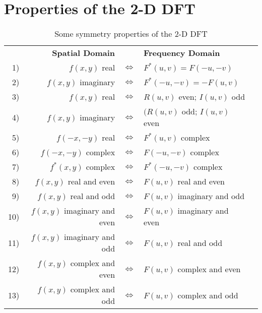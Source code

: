 \appendix
\section{Properties of the 2-D DFT}

\begin{table}[htbp]
	\centering
	\begin{tabular}{|rrllp{0.1cm}|}
	\hline
	& \textbf{Spatial Domain} & & \textbf{Frequency Domain} & \\
	1) & $f(x,y)$ real & $\Leftrightarrow$ & $F^*(u,v) = F(-u,-v)$ & \\
	2) & $f(x,y)$ imaginary & $\Leftrightarrow$ & $F^*(-u,-v) = -F(u,v)$ & \\
	3) & $f(x,y)$ real & $\Leftrightarrow$ & $R(u,v)$ even; $I(u,v)$ odd & \\
	4) & $f(x,y)$ imaginary & $\Leftrightarrow$ & $(R(u,v)$ odd; $I(u,v)$ even & \\
	5) & $f(-x,-y)$ real & $\Leftrightarrow$ & $F^*(u,v)$ complex & \\
	6) & $f(-x,-y)$ complex & $\Leftrightarrow$ & $F(-u,-v)$ complex & \\
	7) & $f^*(x,y)$ complex & $\Leftrightarrow$ & $F^*(-u,-v)$ complex & \\
	8) & $f(x,y)$ real and even & $\Leftrightarrow$ & $F(u,v)$ real and even & \\
	9) & $f(x,y)$ real and odd & $\Leftrightarrow$ & $F(u,v)$ imaginary and odd & \\
	10) & $f(x,y)$ imaginary and even & $\Leftrightarrow$ & $F(u,v)$ imaginary and even & \\
	11) & $f(x,y)$ imaginary and odd & $\Leftrightarrow$ & $F(u,v)$ real and odd & \\
	12) & $f(x,y)$ complex and even & $\Leftrightarrow$ & $F(u,v)$ complex and even & \\
	13) & $f(x,y)$ complex and odd & $\Leftrightarrow$ & $F(u,v)$ complex and odd & \\
	\hline
	\end{tabular}
	\label{tab:Symmetry_2D_DFT}
	\caption{Some symmetry properties of the 2-D DFT}
\end{table}

